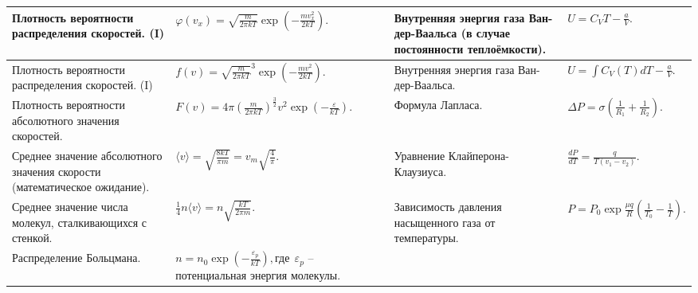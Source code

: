 \documentclass{article}
\begin{document}
\begin{tabular}{ |p{4.3cm}|p{5.2cm}|p{4.3cm}|p{5.2cm}|  }
\hline
Плотность вероятности распределения скоростей. (I)                           &  %
$
\varphi(v_x) = \sqrt{\frac{m}{2\pi k T}} 
\exp \left( -\frac{mv_x^2}{2kT} \right).
$                                                                            &  %
Внутренняя энергия газа Ван-дер-Ваальса (в случае постоянности теплоёмкости).&  %
$U = C_VT - \frac{a}{V}.$                                                    \\ %
\hline
Плотность вероятности распределения скоростей. (I)                           &  %
$
f(v) = \sqrt{\frac{m}{2\pi k T}}^3 
\exp \left( -\frac{mv^2}{2kT} \right).
$                                                                            &  %
Внутренняя энергия газа Ван-дер-Ваальса.                                     &  %
$U = \int C_V(T) dT - \frac{a}{V}.$                                          \\ %
\hline
Плотность вероятности абсолютного значения скоростей.                        &  %
$
F(v) = 
4 \pi \left( \frac{m}{2\pi kT} \right)^\frac{3}{2} v^2 
\exp \left( -\frac{\varepsilon}{kT} \right).
$                                                                            &  %
Формула Лапласа.                                                             &  %
$\Delta P = \sigma \left( \frac{1}{R_1} + \frac{1}{R_2} \right).$            \\ %
\hline
Среднее значение абсолютного значения скорости (математическое ожидание).    &  %
$\langle v \rangle = \sqrt{\frac{8kT}{\pi m}} = v_m \sqrt{\frac{4}{\pi}}.$   &  %
Уравнение Клайперона-Клаузиуса.                                              &  %
$\frac{dP}{dT} = \frac{q}{T(v_1 - v_2)}.$                                    \\ %
\hline
Среднее значение числа молекул, сталкивающихся с стенкой.                    &  %
$\frac{1}{4} n \langle v \rangle = n \sqrt{\frac{kT}{2 \pi m}}.$             &  %
Зависимость давления насыщенного газа от температуры.                        &  %
$P = P_0 \exp \frac{\mu q}{R} \left( \frac{1}{T_0} - \frac{1}{T} \right).$   \\ %
\hline
Распределение Больцмана.                                                     &  %
$
n = n_0 \exp \left( -\frac{\varepsilon_p}{kT} \right), 
\text{где} \:\: \varepsilon_p$ -- потенциальная энергия молекулы.            &  %
                                                                             &  %

\end{tabular}
\end{document}
